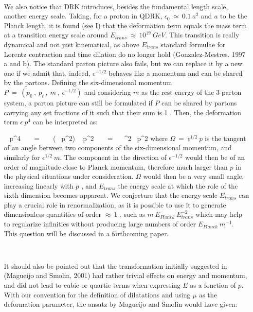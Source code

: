 \documentclass[a4paper,12pt,dvips]{article}
\begin{document}
~

We also notice that DRK introduces, besides the fundamental length scale, another energy scale. Taking, for a proton in QDRK, $\epsilon_0 ~ \simeq ~ 0.1 ~ a^2$ and $a$ to be the Planck length, it is found (see I) that the deformation term equals the mass term at a transition energy scale around $E_{trans} ~ \approx ~ 10^{19} ~ GeV$. This transition is really dynamical and not just kinematical, as above $E_{trans}$ standard formulae for Lorentz contraction and time dilation do no longer hold (Gonzalez-Mestres, 1997 a and b). The standard parton picture also fails, but we can replace it by a new one if we admit that, indeed, $\epsilon ^{-1/2} $ behaves like a momentum and can be shared by the partons. Defining the six-dimensional momentum $P ~ =~ (p_0 ~ , ~ p_i ~ , ~ m ~ , ~ \epsilon ^{-1/2}) $ and considering $m$ as the rest energy of the 3-parton system, a parton picture can still be formulated if $P$ can be shared by partons carrying any set fractions of it such that their sum is 1 . Then, the deformation term $ \epsilon ~ p^4$ can be interpreted as:

\equation
\epsilon ~ p^4 ~ ~ = ~ ~ (\epsilon ~ p^2) ~ p^2 ~ ~ = ~ ~\Omega ^2~ p^2
\endequation
\noindent 
where $\Omega ~ = ~ \epsilon ^{1/2} ~ p$ is the tangent of an angle between two components of the six-dimensional momentum, and similarly for $\epsilon ^{1/2} ~ m$. The component in the direction of $\epsilon ^{-1/2} $ would then be of an order of magnitude close to Planck momentum, therefore much larger than $p$ in the physical situations under consideration. $\Omega $ would then be a very small angle, increasing linearly with $p$ , and $E_{trans}$ the energy scale at which the role of the sixth dimension becomes apparent. We conjecture that the energy scale $E_{trans}$ can play a crucial role in renormalization, as it is possible to use it to generate dimensionless quantities of order $\approx ~ 1 $ , such as $m ~ E_{Planck} ~ E_{trans}^{-2}$ which may help to regularize infinities without producing large numbers of order $ E_{Planck} ~ m^{-1}$. This question will be discussed in a forthcoming paper.

~ 

It should also be pointed out that the transformation initially suggested in (Magueijo and Smolin, 2001) had rather trivial effects on energy and momentum, and did not lead to cubic or quartic terms when expressing $E$ as a fonction of $p$. With our convention for the definition of dilatations and using $\mu $ as the deformation parameter, the ansatz by Magueijo and Smolin would have given:
\end{document}
